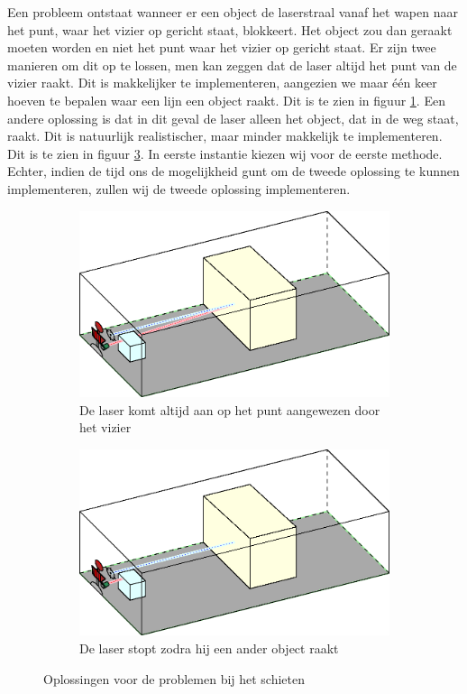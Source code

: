 \documentclass[a4paper,11pt, twoside]{article}
\begin{document}
    Een probleem ontstaat wanneer er een object de laserstraal vanaf het wapen naar het punt, waar het vizier op gericht staat, blokkeert. Het object zou dan geraakt moeten worden en niet het punt waar het vizier op gericht staat. Er zijn twee manieren om dit op te lossen, men kan zeggen dat de laser altijd het punt van de vizier raakt. Dit is makkelijker te implementeren, aangezien we maar \'e\'en keer hoeven te bepalen waar een lijn een object raakt. Dit is te zien in figuur \ref{fig:COL2}. Een andere oplossing is dat in dit geval de laser alleen het object, dat in de weg staat, raakt. Dit is natuurlijk realistischer, maar minder makkelijk te implementeren. Dit is te zien in figuur \ref{fig:COL3}. In eerste instantie kiezen wij voor de eerste methode. Echter, indien de tijd ons de mogelijkheid gunt om de tweede oplossing te kunnen implementeren, zullen wij de tweede oplossing implementeren.
    \FloatBarrier    
    \begin{figure}[h]
    \begin{subfigure}{0.45\textwidth}
    \centering
    \includegraphics[width=\textwidth]{../Graphics/Collision2.eps}
    \caption{De laser komt altijd aan op het punt aangewezen door het vizier}
    \label{fig:COL2}
    \end{subfigure}
    \begin{subfigure}{0.45\textwidth}
    \centering
    \includegraphics[width=\textwidth]{../Graphics/Collision3.eps}
    \caption{De laser stopt zodra hij een ander object raakt}
    \label{fig:COL3}
    \end{subfigure}
    \caption{Oplossingen voor de problemen bij het schieten}
    \end{figure}
\end{document}
